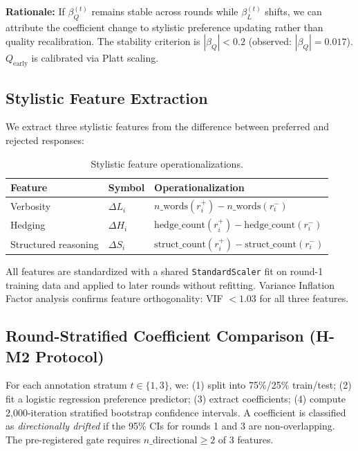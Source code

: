 \textbf{Rationale:} If $\beta_Q^{(t)}$ remains stable across rounds while $\beta_L^{(t)}$ shifts, we can attribute the coefficient change to stylistic preference updating rather than quality recalibration. The stability criterion is $|\beta_Q| < 0.2$ (observed: $|\beta_Q| = 0.017$). $Q_\text{early}$ is calibrated via Platt scaling.

\subsection{Stylistic Feature Extraction}

We extract three stylistic features from the difference between preferred and rejected responses:

\begin{table}[h]
\centering
\caption{Stylistic feature operationalizations.}
\begin{tabular}{lll}
\toprule
Feature & Symbol & Operationalization \\
\midrule
Verbosity & $\Delta L_i$ & $n\_\text{words}(r_i^+) - n\_\text{words}(r_i^-)$ \\
Hedging & $\Delta H_i$ & $\text{hedge\_count}(r_i^+) - \text{hedge\_count}(r_i^-)$ \\
Structured reasoning & $\Delta S_i$ & $\text{struct\_count}(r_i^+) - \text{struct\_count}(r_i^-)$ \\
\bottomrule
\end{tabular}
\end{table}

All features are standardized with a shared \texttt{StandardScaler} fit on round-1 training data and applied to later rounds without refitting. Variance Inflation Factor analysis confirms feature orthogonality: VIF $< 1.03$ for all three features.

\subsection{Round-Stratified Coefficient Comparison (H-M2 Protocol)}

For each annotation stratum $t \in \{1, 3\}$, we: (1) split into 75\%/25\% train/test; (2) fit a logistic regression preference predictor; (3) extract coefficients; (4) compute 2,000-iteration stratified bootstrap confidence intervals. A coefficient is classified as \emph{directionally drifted} if the 95\% CIs for rounds 1 and 3 are non-overlapping. The pre-registered gate requires $n\_\text{directional} \geq 2$ of 3 features.

